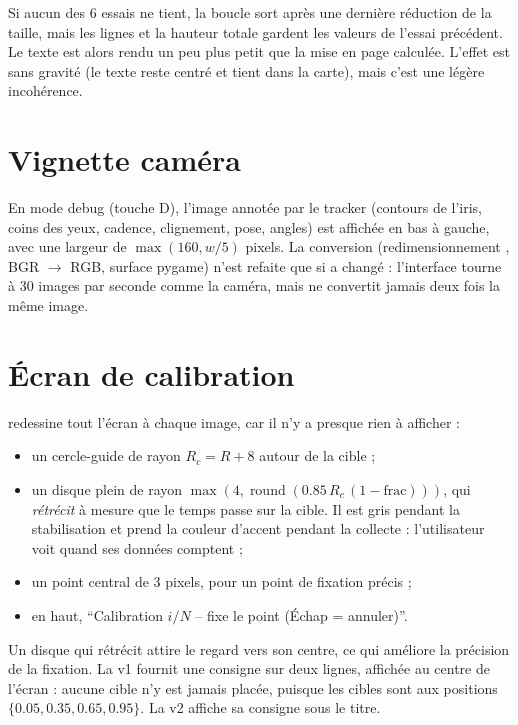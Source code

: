 \begin{attention}
Si aucun des 6 essais ne tient, la boucle sort après une dernière réduction de la taille, mais les lignes et la hauteur totale gardent les valeurs de l'essai précédent. Le texte est alors rendu un peu plus petit que la mise en page calculée. L'effet est sans gravité (le texte reste centré et tient dans la carte), mais c'est une légère incohérence.
\end{attention}

\section{Vignette caméra}

En mode debug (touche D), l'image annotée par le tracker (contours de l'iris, coins des yeux, cadence, clignement, pose, angles) est affichée en bas à gauche, avec une largeur de $\max(160, w/5)$ pixels. La conversion (redimensionnement , BGR $\to$ RGB, surface pygame) n'est refaite que si  a changé : l'interface tourne à 30 images par seconde comme la caméra, mais ne convertit jamais deux fois la même image.

\section{Écran de calibration}

 redessine tout l'écran à chaque image, car il n'y a presque rien à afficher :
\begin{itemize}
  \item un cercle-guide de rayon $R_c = R + 8$ autour de la cible ;
  \item un disque plein de rayon $\max(4, \operatorname{round}(0.85\,R_c\,(1 - \text{frac})))$, qui \emph{rétrécit} à mesure que le temps passe sur la cible. Il est gris pendant la stabilisation et prend la couleur d'accent pendant la collecte : l'utilisateur voit quand ses données comptent ;
  \item un point central de 3 pixels, pour un point de fixation précis ;
  \item en haut, \enquote{Calibration $i/N$ -- fixe le point (Échap = annuler)}.
\end{itemize}
Un disque qui rétrécit attire le regard vers son centre, ce qui améliore la précision de la fixation. La v1 fournit une consigne sur deux lignes, affichée au centre de l'écran : aucune cible n'y est jamais placée, puisque les cibles sont aux positions $\{0.05, 0.35, 0.65, 0.95\}$. La v2 affiche sa consigne sous le titre.
